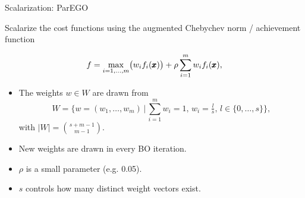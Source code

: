 \documentclass[11pt,compress,t,notes=noshow,xcolor=table]{beamer}
\begin{document}
\begin{vbframe}{Scalarization: ParEGO}

Scalarize the cost functions using the augmented Chebychev norm / achievement function

\[
f = \max_{i=1,\dots,m}\bigl(w_i f_i(\pmb{x})\bigr) 
    + \rho \sum_{i=1}^m w_i f_i(\pmb{x}),
\]

\begin{itemize}
  \item The weights $w \in W$ are drawn from
    \[
      W = 
        \bigl\{ w = (w_1, \dots, w_m) \,\big|\,
                \sum_{i=1}^m w_i = 1,\, w_i = \tfrac{l}{s},\, l \in \{0,\dots,s\}
        \bigr\},
    \]
    with $\lvert W \rvert = \binom{s+m-1}{m-1}$.
  \item New weights are drawn in every BO iteration.
  \item $\rho$ is a small parameter (e.g. 0.05).
  \item $s$ controls how many distinct weight vectors exist.
\end{itemize}

\end{vbframe}
\end{document}
